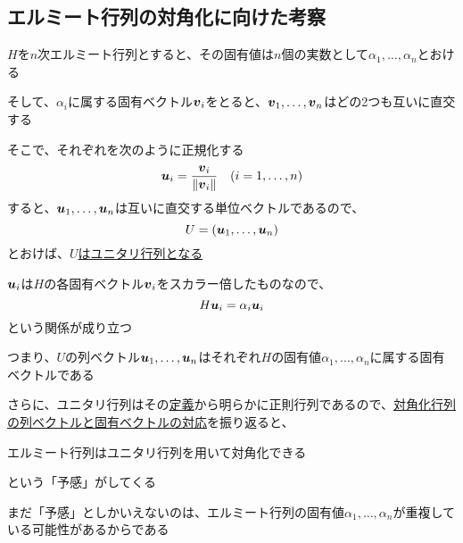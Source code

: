 \documentclass[../../../topic_linear-algebra]{subfiles}
\begin{document}
\subsection{エルミート行列の対角化に向けた考察}

$H$を$n$次エルミート行列とすると、その固有値は$n$個の実数として$\alpha_1,\ldots,\alpha_n$とおける

そして、$\alpha_i$に属する固有ベクトル$\vb*{v}_i$をとると、$\vb*{v}_1, \ldots, \vb*{v}_n$はどの2つも互いに直交する

\br

そこで、それぞれを次のように正規化する
\begin{equation*}
  \vb*{u}_i = \frac{\vb*{v}_i}{\|\vb*{v}_i\|} \quad (i = 1, \ldots, n)
\end{equation*}
すると、$\vb*{u}_1, \ldots, \vb*{u}_n$は互いに直交する単位ベクトルであるので、
\begin{equation*}
  U = (\vb*{u}_1, \ldots, \vb*{u}_n)
\end{equation*}
とおけば、\hyperref[thm:unitary-iff-columns-orthonormal]{$U$はユニタリ行列となる}

\br

$\vb*{u}_i$は$H$の各固有ベクトル$\vb*{v}_i$をスカラー倍したものなので、
\begin{equation*}
  H\vb*{u}_i = \alpha_i \vb*{u}_i
\end{equation*}
という関係が成り立つ

つまり、$U$の列ベクトル$\vb*{u}_1, \ldots, \vb*{u}_n$はそれぞれ$H$の固有値$\alpha_1, \ldots, \alpha_n$に属する固有ベクトルである

\br

さらに、ユニタリ行列はその\hyperref[def:unitary-matrix]{定義}から明らかに正則行列であるので、\hyperref[thm:diagonalization-columns-are-eigenvectors]{対角化行列の列ベクトルと固有ベクトルの対応}を振り返ると、
\begin{shaded}
  エルミート行列はユニタリ行列を用いて対角化できる
\end{shaded}
という「予感」がしてくる

\br

まだ「予感」としかいえないのは、エルミート行列の固有値$\alpha_1, \ldots, \alpha_n$が重複している可能性があるからである
\end{document}
